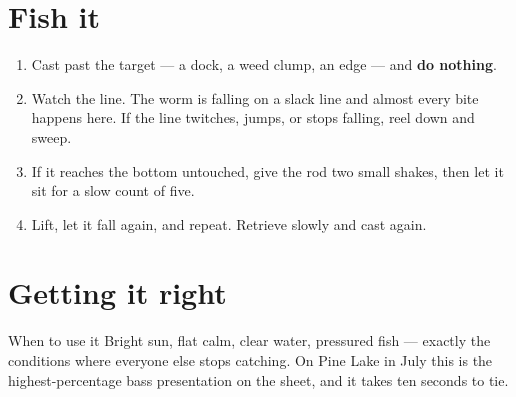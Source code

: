 \section{Fish it}
\begin{enumerate}
\item Cast past the target --- a dock, a weed clump, an edge --- and \textbf{do nothing}.
\item Watch the line. The worm is falling on a slack line and almost every bite happens here. If the line twitches, jumps, or stops falling, reel down and sweep.
\item If it reaches the bottom untouched, give the rod two small shakes, then let it sit for a slow count of five.
\item Lift, let it fall again, and repeat. Retrieve slowly and cast again.
\end{enumerate}

\section{Getting it right}
\begin{telosfacts}[0.20]
\end{telosfacts}

\begin{telospanel}{When to use it}
Bright sun, flat calm, clear water, pressured fish --- exactly the conditions where everyone else stops catching. On Pine Lake in July this is the highest-percentage bass presentation on the sheet, and it takes ten seconds to tie.
\end{telospanel}

